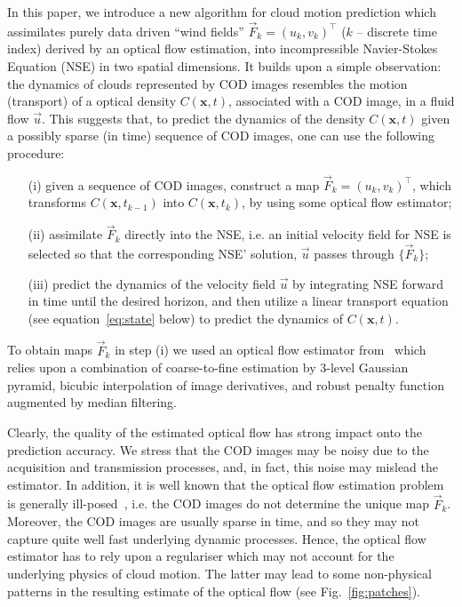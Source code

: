 \documentclass[onecolumn, 12pt, conference]{ieeeconf}
\def\F{\vec{F}}
\renewcommand{\u}{\vec{u}}
\begin{document}
In this paper, we introduce a new algorithm for cloud motion prediction which assimilates purely data driven ``wind fields'' $\F_k=(u_k,v_k)^\top$ ($k$ -- discrete time index) derived by an optical flow estimation, into incompressible Navier-Stokes Equation (NSE) in two spatial dimensions. It builds upon a simple observation: the dynamics of clouds represented by COD images resembles the motion (transport) of a optical density $C(\bm{x},t)$, associated with a COD image, in a fluid flow $\u$. This suggests that, to predict the dynamics of the density $C(\bm{x},t)$ given a possibly sparse (in time) sequence of COD images, one can use the following procedure:
\begin{itemize}
\item [(i)] given a sequence of COD images, construct a map $\F_k=(u_k,v_k)^\top$, which transforms $C(\bm{x},t_{k-1})$ into $C(\bm{x},t_{k})$, by using some optical flow estimator;
\item [(ii)] assimilate $\F_k$ directly into the NSE, i.e. an initial velocity field for NSE is selected so that the corresponding NSE' solution, $\u$ passes through $\{\F_k\}$;
\item [(iii)] predict the dynamics of the velocity field $\u$ by integrating NSE forward in time until the desired horizon, and then utilize a linear transport equation (see equation~\eqref{eq:state} below) to predict the dynamics of $C(\bm{x},t)$.
\end{itemize}
To obtain maps $\F_k$ in step (i) we used an optical flow estimator from~\cite{sun13} which relies upon a combination of coarse-to-fine estimation by 3-level Gaussian pyramid, bicubic interpolation of image derivatives, and  robust penalty function augmented by median filtering.

Clearly, the quality of the estimated optical flow has strong impact onto the prediction accuracy. We stress that the COD images may be noisy due to the acquisition and transmission processes, and, in fact, this noise may mislead the estimator. In addition, it is well known that the optical flow estimation problem is generally ill-posed~\cite{HerlinBMZ12}, i.e. the COD images do not determine the unique map $\F_k$. Moreover, the COD images are usually sparse in time, and so they may not capture quite well fast underlying dynamic processes. Hence, the optical flow estimator has to rely upon a regulariser which may not account for the underlying physics of cloud motion. The latter may lead to some non-physical patterns in the resulting estimate of the optical flow (see Fig.~\ref{fig:patches}).
\end{document}
